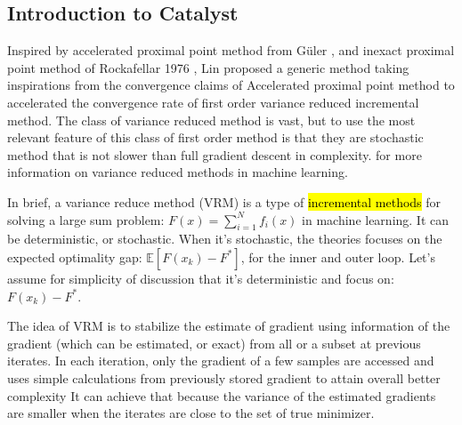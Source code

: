 \documentclass[12pt]{article}
\begin{document}
    \subsection{Introduction to Catalyst}
        Inspired by accelerated proximal point method from Güler \cite{guler_new_1992}, and inexact proximal point method of Rockafellar 1976 \cite{rockafellar_monotone_1976}, Lin \cite{lin_universal_2015} proposed a generic method taking inspirations from the convergence claims of Accelerated proximal point method to accelerated the convergence rate of first order variance reduced incremental method. 
        The class of variance reduced method is vast, but to use the most relevant feature of this class of first order method is that they are stochastic method that is not slower than full gradient descent in complexity. 
         for more information on variance reduced methods in machine learning. 
        \par
        In brief, a variance reduce method (VRM) is a type of 
        {\hl{incremental methods}}
        for solving a large sum problem: $F(x) = \sum_{i = 1}^{N} f_i(x)$ in machine learning.
        It can be deterministic, or stochastic. 
        When it's stochastic, the theories focuses on the expected optimality gap: $\mathbb E[F(x_k) - F^*]$, for the inner and outer loop. 
        Let's assume for simplicity of discussion that it's deterministic and focus on: $F(x_k) - F^*$. 
        \par 
        The idea of VRM is to stabilize the estimate of gradient using information of the gradient (which can be estimated, or exact) from all or a subset at previous iterates. 
        In each iteration, only the gradient of a few samples are accessed and uses simple calculations from previously stored gradient to attain overall better complexity 
        It can achieve that because the variance of the estimated gradients are smaller when the iterates are close to the set of true minimizer. 
\end{document}
